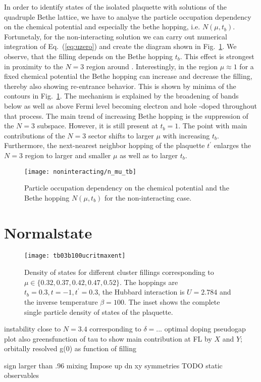 \documentclass[aps,prb,twocolumn,groupedaddress,amsmath,amssymb]{revtex4-1}
\newcommand{\refeq}[1]{Eq.~(\ref{#1})}
\newcommand{\reffig}[1]{Fig.~\ref{#1}}
\begin{document}
In order to identify states of the isolated plaquette with solutions of the quadruple Bethe lattice, we have to analyse the particle occupation dependency on the chemical potential and especially the bethe hopping, i.e. $N(\mu,t_b)$. Fortunetaly, for the non-interacting solution we can carry out numerical integration of \refeq{eq:uzero} and create the diagram shown in \reffig{fig:nonintnmutb}. We observe, that the filling depends on the Bethe hopping $t_b$. This effect is strongest in proximity to the $N=3$ region around . Interestingly, in the region $\mu\approx 1$ for a fixed chemical potential the Bethe hopping can increase and decrease the filling, thereby also showing re-entrance behavior. This is shown by minima of the contours in \reffig{fig:nonintnmutb}. The mechanism is explained by the broadening of bands below as well as above Fermi level becoming electron and hole -doped throughout that process. The main trend of increasing Bethe hopping is the suppression of the $N=3$ subspace. However, it is still present at $t_b=1$. The point with main contributions of the $N=3$ sector shifts to larger $\mu$ with increasing $t_b$. Furthermore, the next-nearest neighbor hopping of the plaquette $t^\prime$ enlarges the $N=3$ region to larger and smaller $\mu$ as well as to larger $t_b$.
\begin{figure}[th]
  \texttt{[image: noninteracting/n\_mu\_tb]}
  \caption{Particle occupation dependency on the chemical potential and the Bethe hopping $N(\mu,t_b)$ for the non-interacting case.}
  \label{fig:nonintnmutb}
\end{figure}
 \section{Normalstate}
\begin{figure}[th]
  \texttt{[image: tb03b100ucritmaxent]}
  \caption{Density of states for different cluster fillings corresponding to $\mu \in \{0.32,0.37,0.42,0.47,0.52\}$. The hoppings are $t_b=0.3, t=-1, t^\prime= 0.3$, the Hubbard interaction is $U=2.784$ and the inverse temperature $\beta=100$. The inset shows the complete single particle density of states of the plaquette.}
  \label{fig:dosnormalstate}
\end{figure}
instability close to $N=3.4$ corresponding to $\delta=...$ optimal doping
pseudogap
plot also greensfunction of tau to show main contribution at FL by $X$ and $Y$; orbitally resolved g(0) as function of filling

sign larger than .96
mixing
Impose up dn xy symmetries
TODO static observables
\end{document}
